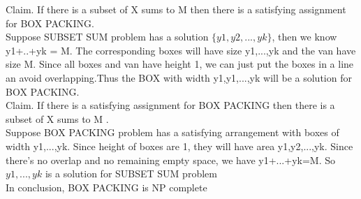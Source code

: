 \documentclass[12pt]{article}
\begin{document}
Claim. If there is a subset of X sums to M then there is a satisfying assignment for BOX PACKING.\\
Suppose SUBSET SUM problem has a solution $\{y1,y2,...,yk\}$, then we know y1+..+yk = M. The corresponding boxes will have size y1,...,yk and the van have size M. Since all boxes and van have height 1, we can just put the boxes in a line an avoid  overlapping.Thus the BOX with width y1,y1,...,yk will be a solution for BOX PACKING.\\
Claim. If there is a satisfying assignment for BOX PACKING  then there is a subset of X sums to M .\\
Suppose BOX PACKING problem has a satisfying arrangement with boxes of width y1,...,yk. Since height of boxes are 1, they will have area y1,y2,...,yk. Since there's no overlap and no remaining empty space, we have y1+...+yk=M. So ${y1,...,yk}$ is a solution for SUBSET SUM problem\\

In conclusion, BOX PACKING is NP complete
\end{document}
